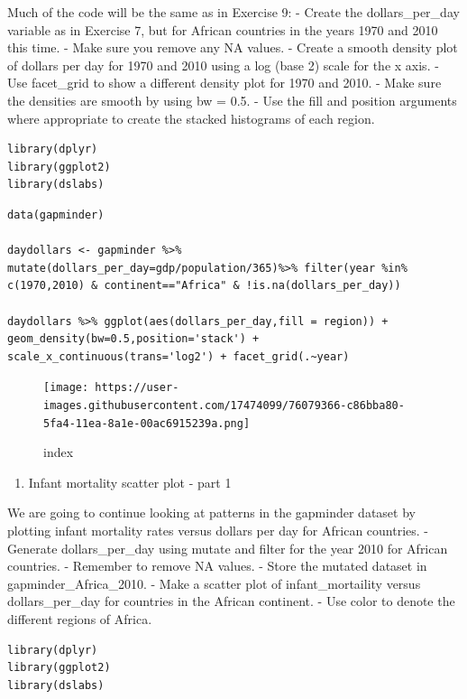 \documentclass[
]{article}
\providecommand{\tightlist}{%
  \setlength{\itemsep}{0pt}\setlength{\parskip}{0pt}}
\begin{document}
Much of the code will be the same as in Exercise 9: - Create the
dollars\_per\_day variable as in Exercise 7, but for African countries
in the years 1970 and 2010 this time. - Make sure you remove any NA
values. - Create a smooth density plot of dollars per day for 1970 and
2010 using a log (base 2) scale for the x axis. - Use facet\_grid to
show a different density plot for 1970 and 2010. - Make sure the
densities are smooth by using bw = 0.5. - Use the fill and position
arguments where appropriate to create the stacked histograms of each
region.

\begin{verbatim}
library(dplyr)
library(ggplot2)
library(dslabs)
\end{verbatim}

\begin{verbatim}
data(gapminder)

daydollars <- gapminder %>% mutate(dollars_per_day=gdp/population/365)%>% filter(year %in% c(1970,2010) & continent=="Africa" & !is.na(dollars_per_day))

daydollars %>% ggplot(aes(dollars_per_day,fill = region)) + geom_density(bw=0.5,position='stack') + scale_x_continuous(trans='log2') + facet_grid(.~year)
\end{verbatim}

\begin{figure}
\centering
\texttt{[image: https://user-images.githubusercontent.com/17474099/76079366-c86bba80-5fa4-11ea-8a1e-00ac6915239a.png]}
\caption{index}
\end{figure}

\begin{enumerate}
\def\labelenumi{\arabic{enumi}.}
\setcounter{enumi}{10}
\tightlist
\item
  Infant mortality scatter plot - part 1
\end{enumerate}

We are going to continue looking at patterns in the gapminder dataset by
plotting infant mortality rates versus dollars per day for African
countries. - Generate dollars\_per\_day using mutate and filter for the
year 2010 for African countries. - Remember to remove NA values. - Store
the mutated dataset in gapminder\_Africa\_2010. - Make a scatter plot of
infant\_mortaility versus dollars\_per\_day for countries in the African
continent. - Use color to denote the different regions of Africa.

\begin{verbatim}
library(dplyr)
library(ggplot2)
library(dslabs)
\end{verbatim}
\end{document}
